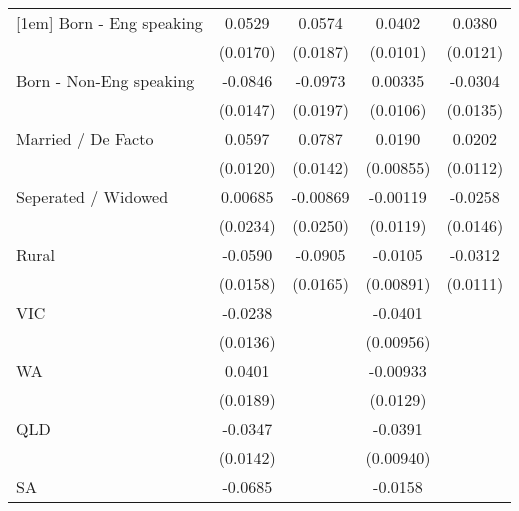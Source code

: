 {\begin{tabular}{l*{4}{c}}
[1em]
Born - Eng speaking &      0.0529\sym{**} &      0.0574\sym{**} &      0.0402\sym{***}&      0.0380\sym{**} \\
                    &    (0.0170)         &    (0.0187)         &    (0.0101)         &    (0.0121)         \\
[1em]
Born - Non-Eng speaking&     -0.0846\sym{***}&     -0.0973\sym{***}&     0.00335         &     -0.0304\sym{*}  \\
                    &    (0.0147)         &    (0.0197)         &    (0.0106)         &    (0.0135)         \\
[1em]
Married / De Facto  &      0.0597\sym{***}&      0.0787\sym{***}&      0.0190\sym{*}  &      0.0202         \\
                    &    (0.0120)         &    (0.0142)         &   (0.00855)         &    (0.0112)         \\
[1em]
Seperated / Widowed &     0.00685         &    -0.00869         &    -0.00119         &     -0.0258         \\
                    &    (0.0234)         &    (0.0250)         &    (0.0119)         &    (0.0146)         \\
[1em]
Rural               &     -0.0590\sym{***}&     -0.0905\sym{***}&     -0.0105         &     -0.0312\sym{**} \\
                    &    (0.0158)         &    (0.0165)         &   (0.00891)         &    (0.0111)         \\
[1em]
VIC                 &     -0.0238         &                     &     -0.0401\sym{***}&                     \\
                    &    (0.0136)         &                     &   (0.00956)         &                     \\
[1em]
WA                  &      0.0401\sym{*}  &                     &    -0.00933         &                     \\
                    &    (0.0189)         &                     &    (0.0129)         &                     \\
[1em]
QLD                 &     -0.0347\sym{*}  &                     &     -0.0391\sym{***}&                     \\
                    &    (0.0142)         &                     &   (0.00940)         &                     \\
[1em]
SA                  &     -0.0685\sym{***}&                     &     -0.0158         &                     \\

\end{tabular}}
